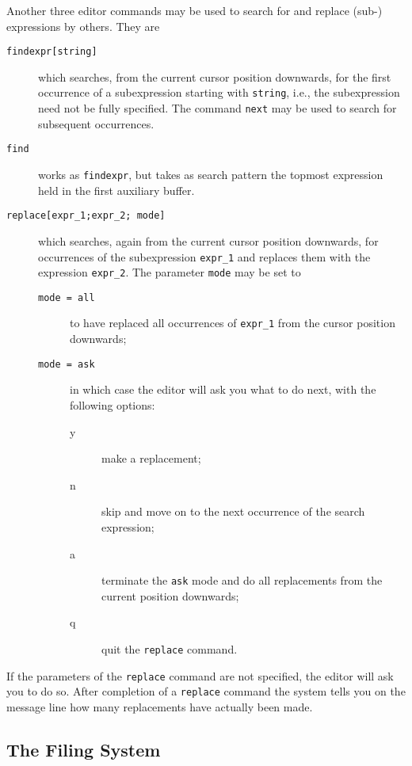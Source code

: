Another three editor commands may be used to search for and replace (sub-) expressions
by others. They are
\begin{description}
\item[{\tt findexpr[string]}] which searches, from the current cursor position downwards,
for the first occurrence of a subexpression starting with {\tt string}, i.e., the subexpression
need not be fully specified. The command {\tt next} may be used to search for subsequent
 occurrences.  
\item[{\tt find}] works as {\tt findexpr}, but takes as search pattern the topmost expression
held in the first auxiliary buffer.
\item[{\tt replace[expr\_1;expr\_2; mode]}] which searches, again from the current cursor
position downwards, for occurrences of the subexpression {\tt expr\_1} and replaces them
with the expression {\tt expr\_2}. The parameter {\tt mode} may be set to
\begin{description}
\item[{\tt mode = all}] to have replaced  all occurrences of {\tt expr\_1} from the cursor 
position downwards; 
\item[{\tt mode = ask}] in which case the editor will ask you what to do next, with the
following options:
\begin{description}
\item[y] make a replacement;
\item[n] skip and move on to the next occurrence of the search expression;
\item[a] terminate the {\tt ask} mode and do all replacements from the current
position downwards;
\item[q] quit the {\tt replace} command.
\end{description}
\end{description}
\end{description}
If the parameters of the {\tt replace} command are not specified, the editor will ask
you to do so.
After completion of a {\tt replace} command the system tells you on the message line
how many replacements have actually been made.

\subsection{The Filing System}

